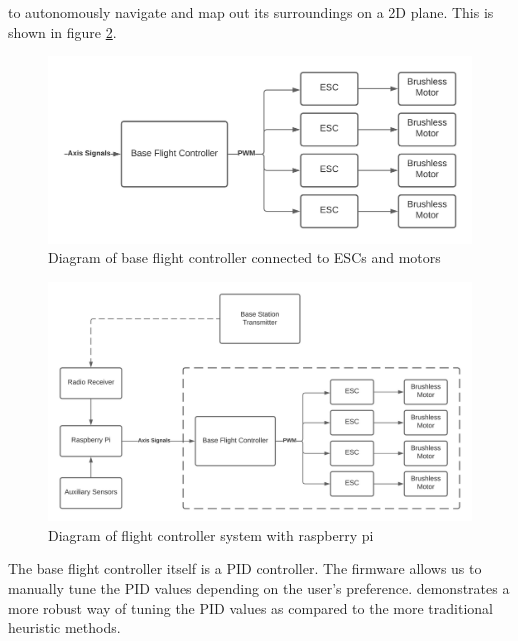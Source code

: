 \documentclass[english]{upeeei}
\begin{document}
to autonomously navigate and map out its surroundings on a 2D plane. This is shown in figure \ref{fig:FC_system_diagram}.
\begin{figure}[h]
    \centering
    \includegraphics[scale=0.5]{images/base_FC_diagram.png}
    \caption{Diagram of base flight controller connected to ESCs and motors}
    \label{fig:base_FC_diagram}
\end{figure}
\begin{figure}[h]
    \centering
    \includegraphics[scale=0.5]{images/fc_with_rpi.png}
    \caption{Diagram of flight controller system with raspberry pi}
    \label{fig:FC_system_diagram}
\end{figure}
The base flight controller itself is a PID controller. The firmware allows us to manually tune the PID values depending 
on the user's preference. \cite{Tuning2017} demonstrates a more robust way of tuning the PID values as compared to the
more traditional heuristic methods.
\end{document}
